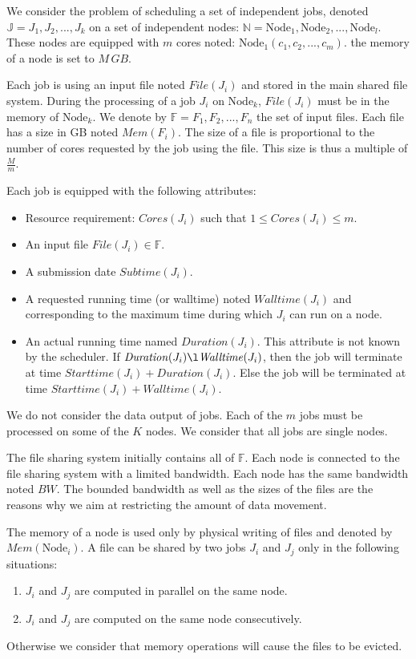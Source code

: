 \documentclass[conference,10pt]{IEEEtran}
\newcommand{\Node}[1]{\ensuremath{\mathrm{Node}_{#1}}\xspace}
\newcommand{\file}{\ensuremath{\mathit{File}}\xspace}
\newcommand{\memory}{\ensuremath{\mathit{Mem}}\xspace}
\newcommand{\duration}{\mathit{Duration}\xspace}
\newcommand{\bandwidth}{\mathit{BW}\xspace}
\newcommand{\core}{\mathit{Cores}\xspace}
\newcommand{\submissiontime}{\mathit{Subtime}\xspace}
\newcommand{\walltime}{\mathit{Walltime}\xspace}
\newcommand{\start}{\mathit{Starttime}\xspace}
\newcommand{\fileset}{\ensuremath{\mathbb{F}}\xspace}
\newcommand{\jobset}{\ensuremath{\mathbb{J}}\xspace}
\newcommand{\nodeset}{\ensuremath{\mathbb{N}}\xspace}
\begin{document}
We consider the problem of scheduling a set of independent jobs,
denoted $\jobset = {J_1, J_2, ..., J_k}$ on a set of independent nodes:
$\nodeset = {\Node{1}, \Node{2}, ..., \Node{l}}$.
These nodes are equipped with $m$ cores noted: $\Node{1}(c_1, c_2, ..., c_m)$.
the memory of a node is set to $M\,GB$.

Each job is using an input file noted $\file(J_i)$ and
stored in the main shared file system.
During the processing of a job $J_i$ on $\Node{k}$,
$\file(J_i)$ must be in the memory of $\Node{k}$. 
We denote by $\fileset = F_1, F_2, ..., F_n$ the set of input files.
Each file has a size in GB noted $\memory(F_i)$.
The size of a file is proportional to the number of cores requested by the job using the file.
This size is thus a multiple of $\frac{M}{m}$.

Each job is equipped with the following attributes:
\begin{itemize}
	\item Resource requirement: $\core(J_i)$ such that $1 \leq \core(J_i) \leq m$.
	\item An input file $\file(J_i) \in \fileset$.
	\item A submission date $\submissiontime(J_i)$.
	\item A requested running time (or walltime) noted $\walltime(J_i)$ and corresponding to
	the maximum time during which $J_i$ can run on a node.
	\item An actual running time named $\duration(J_i)$. This attribute is not known by
	the scheduler. If $\duration(J_i) \l \walltime(J_i)$, then the job will terminate at
	time $\start(J_i) + \duration(J_i)$. 
	Else the job will be terminated at time $\start(J_i) + \walltime(J_i)$.
\end{itemize}

We do not consider the data output of jobs.
Each of the $m$ jobs must be processed on some of the $K$ nodes. 
We consider that all jobs are single nodes.

The file sharing system initially contains all of $\fileset$.
Each node is connected to the file sharing system with a limited bandwidth.
Each node has the same bandwidth noted $\bandwidth$.
The bounded bandwidth as well as the sizes of the files are the reasons why
we aim at restricting the amount of data movement.

The memory of a node is used only by physical writing of files and denoted by $\memory(\Node{i})$.
A file can be shared by two jobs $J_i$ and $J_j$ only in the following situations:
\begin{enumerate}
	\item $J_i$ and $J_j$ are computed in parallel on the same node.
	\item $J_i$ and $J_j$ are computed on the same node consecutively.
\end{enumerate}
Otherwise we consider that memory operations will cause the files to be evicted.
\end{document}
